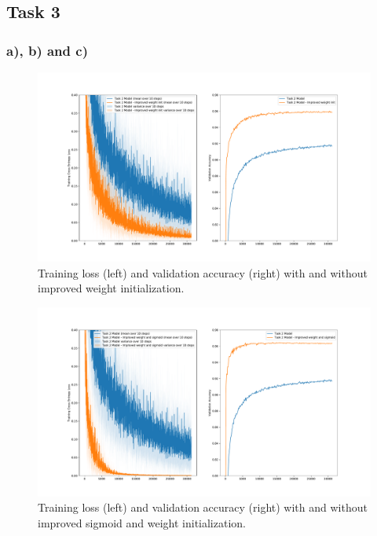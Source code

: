 \subsection*{Task 3}

\subsubsection*{a), b) and c)}

\begin{figure}[h!]
  \centering
  \includegraphics[clip, trim=3cm 0.5cm 3cm 0.5cm, width=\textwidth]{figures/Task3a.pdf}
  \caption{Training loss (left) and validation accuracy (right) with and without improved weight initialization.}
  \label{fig:task3:a}
\end{figure}

\begin{figure}[h!]
  \centering
  \includegraphics[clip, trim=3cm 0.5cm 3cm 0.5cm, width=\textwidth]{figures/Task3b.pdf}
  \caption{Training loss (left) and validation accuracy (right) with and without improved sigmoid and weight initialization.}
  \label{fig:task3:b}
\end{figure}

